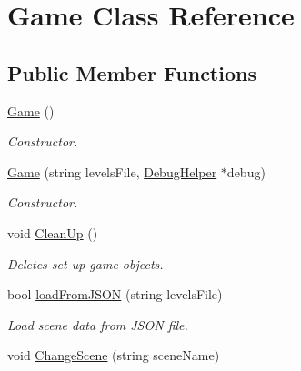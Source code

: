 \hypertarget{class_game}{\section{Game Class Reference}
\label{class_game}
}
\subsection*{Public Member Functions}
\begin{DoxyCompactItemize}
\item 
\hypertarget{class_game_ad59df6562a58a614fda24622d3715b65}{\hyperlink{class_game_ad59df6562a58a614fda24622d3715b65}{Game} ()}\label{class_game_ad59df6562a58a614fda24622d3715b65}

\begin{DoxyCompactList}\small\item\em Constructor. \end{DoxyCompactList}\item 
\hypertarget{class_game_a4d40c0573774dd8f3334d7b568c00b5c}{\hyperlink{class_game_a4d40c0573774dd8f3334d7b568c00b5c}{Game} (string levels\+File, \hyperlink{class_debug_helper}{Debug\+Helper} $\ast$debug)}\label{class_game_a4d40c0573774dd8f3334d7b568c00b5c}

\begin{DoxyCompactList}\small\item\em Constructor. \end{DoxyCompactList}\item 
\hypertarget{class_game_afe8f2a4980f240bbfba8c1f495ff5075}{void \hyperlink{class_game_afe8f2a4980f240bbfba8c1f495ff5075}{Clean\+Up} ()}\label{class_game_afe8f2a4980f240bbfba8c1f495ff5075}

\begin{DoxyCompactList}\small\item\em Deletes set up game objects. \end{DoxyCompactList}\item 
\hypertarget{class_game_adc5df650d2425ea6c3be9c457af2b702}{bool \hyperlink{class_game_adc5df650d2425ea6c3be9c457af2b702}{load\+From\+J\+S\+O\+N} (string levels\+File)}\label{class_game_adc5df650d2425ea6c3be9c457af2b702}

\begin{DoxyCompactList}\small\item\em Load scene data from J\+S\+O\+N file. \end{DoxyCompactList}\item 
\hypertarget{class_game_a2188abf2b6fe1782fd18609065f06948}{void \hyperlink{class_game_a2188abf2b6fe1782fd18609065f06948}{Change\+Scene} (string scene\+Name)}\label{class_game_a2188abf2b6fe1782fd18609065f06948}


\end{DoxyCompactItemize}
